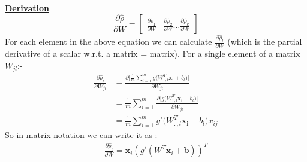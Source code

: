 \begin{frame}
\small
    \begin{overlayarea}{\textwidth}{\textheight}
    \vspace{0.025cm}
    \underline{\textbf{Derivation}}
\[
    \frac{\partial \hat{\rho}}{\partial W} = \begin{bmatrix}
    \frac{\partial \hat{\rho}_1}{\partial W} & \frac{\partial \hat{\rho}_2}{\partial W} \dots \frac{\partial \hat{\rho}_k}{\partial W}
    \end{bmatrix}
\]
    For each element in the above equation we can calculate $\frac{\partial \hat{\rho}_l}{\partial W}$ (which is the partial derivative of a scalar w.r.t. a matrix = matrix).
    For a single element of a matrix $W_{jl}$:-
    \begin{align*}
	\frac{\partial \hat{\rho}_l}{\partial W_{jl}} &= \frac{\partial \Big[ \frac{1}{m} \sum_{i=1}^{m} g \big( W_{:,l}^{T}\mathbf{x_i}+b_l\big) \Big] }{\partial W_{jl}}\\
	&= \frac{1}{m} \sum_{i=1}^{m}\frac{\partial \Big[ g \big( W_{:,l}^{T}\mathbf{x_i}+b_l\big) \Big] }{\partial W_{jl}}\\
	&= \frac{1}{m} \sum_{i=1}^{m} g' \big( W_{:,l}^{T}\mathbf{x_i}+b_l\big) x_{ij}
    \end{align*}
    \vspace{-0.1cm}
    So in matrix notation we can write it as :
    \begin{align*}
    \frac{\partial{\hat{\rho}_{l}}}{\partial{W}} = \textbf{x}_{i}(g'(W^{T}\textbf{x}_{i} + \mathbf{b}))^{T} 
    \end{align*}
	\end{overlayarea}
\end{frame}


